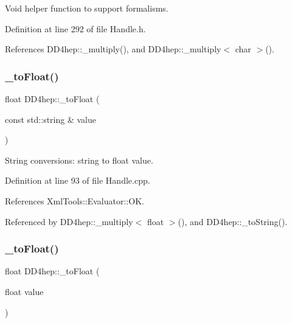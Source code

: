 Void helper function to support formalisms. 



Definition at line 292 of file Handle.\+h.



References D\+D4hep\+::\+\_\+multiply(), and D\+D4hep\+::\+\_\+multiply$<$ char $>$().

\hypertarget{group___d_d4_h_e_p___g_e_o_m_e_t_r_y_ga2f50b01d809f29936deacf00abd120be}{}\label{group___d_d4_h_e_p___g_e_o_m_e_t_r_y_ga2f50b01d809f29936deacf00abd120be} 
\subsubsection{\texorpdfstring{\+\_\+to\+Float()}{\_toFloat()}\hspace{0.1cm}{\footnotesize\ttfamily [1/2]}}
{\footnotesize\ttfamily float D\+D4hep\+::\+\_\+to\+Float (\begin{DoxyParamCaption}\item[{const std\+::string \&}]{value }\end{DoxyParamCaption})}



String conversions\+: string to float value. 



Definition at line 93 of file Handle.\+cpp.



References Xml\+Tools\+::\+Evaluator\+::\+OK.



Referenced by D\+D4hep\+::\+\_\+multiply$<$ float $>$(), and D\+D4hep\+::\+\_\+to\+String().

\hypertarget{group___d_d4_h_e_p___g_e_o_m_e_t_r_y_gaab1bf6ab129e49ea7ff106c361f73978}{}\label{group___d_d4_h_e_p___g_e_o_m_e_t_r_y_gaab1bf6ab129e49ea7ff106c361f73978} 
\subsubsection{\texorpdfstring{\+\_\+to\+Float()}{\_toFloat()}\hspace{0.1cm}{\footnotesize\ttfamily [2/2]}}
{\footnotesize\ttfamily float D\+D4hep\+::\+\_\+to\+Float (\begin{DoxyParamCaption}\item[{float}]{value }\end{DoxyParamCaption})\hspace{0.3cm}{\ttfamily [inline]}}



